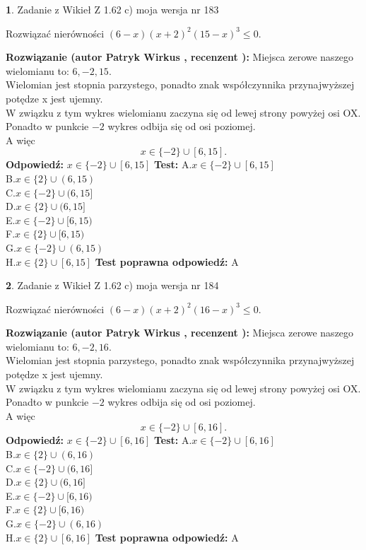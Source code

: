 \documentclass[12pt, a4paper]{article}
\theoremstyle{definition} %
\newtheorem{zad}{}
\newcommand{\zadStart}[1]{\begin{zad}#1\newline}
\newcommand{\zadStop}{\end{zad}}
\newcommand{\rozwStart}[2]{\noindent \textbf{Rozwiązanie (autor #1 , recenzent #2): }\newline}
\newcommand{\rozwStop}{\newline}
\newcommand{\odpStart}{\noindent \textbf{Odpowiedź:}\newline}
\newcommand{\odpStop}{\newline}
\newcommand{\testStart}{\noindent \textbf{Test:}\newline}
\newcommand{\testStop}{\newline}
\newcommand{\kluczStart}{\noindent \textbf{Test poprawna odpowiedź:}\newline}
\newcommand{\kluczStop}{\newline}
\begin{document}
\zadStart{Zadanie z Wikieł Z 1.62 c) moja wersja nr 183}

Rozwiązać nierówności $(6-x)(x+2)^{2}(15-x)^{3}\le0$.
\zadStop
\rozwStart{Patryk Wirkus}{}
Miejsca zerowe naszego wielomianu to: $6, -2, 15$.\\
Wielomian jest stopnia parzystego, ponadto znak współczynnika przy\linebreak najwyższej potędze x jest ujemny.\\ W związku z tym wykres wielomianu zaczyna się od lewej strony powyżej osi OX.\\
Ponadto w punkcie $-2$ wykres odbija się od osi poziomej.\\
A więc $$x \in \{-2\} \cup [6,15].$$
\rozwStop
\odpStart
$x \in \{-2\} \cup [6,15]$
\odpStop
\testStart
A.$x \in \{-2\} \cup [6,15]$\\
B.$x \in \{2\} \cup (6,15)$\\
C.$x \in \{-2\} \cup (6,15]$\\
D.$x \in \{2\} \cup (6,15]$\\
E.$x \in \{-2\} \cup [6,15)$\\
F.$x \in \{2\} \cup [6,15)$\\
G.$x \in \{-2\} \cup (6,15)$\\
H.$x \in \{2\} \cup [6,15]$
\testStop
\kluczStart
A
\kluczStop



\zadStart{Zadanie z Wikieł Z 1.62 c) moja wersja nr 184}

Rozwiązać nierówności $(6-x)(x+2)^{2}(16-x)^{3}\le0$.
\zadStop
\rozwStart{Patryk Wirkus}{}
Miejsca zerowe naszego wielomianu to: $6, -2, 16$.\\
Wielomian jest stopnia parzystego, ponadto znak współczynnika przy\linebreak najwyższej potędze x jest ujemny.\\ W związku z tym wykres wielomianu zaczyna się od lewej strony powyżej osi OX.\\
Ponadto w punkcie $-2$ wykres odbija się od osi poziomej.\\
A więc $$x \in \{-2\} \cup [6,16].$$
\rozwStop
\odpStart
$x \in \{-2\} \cup [6,16]$
\odpStop
\testStart
A.$x \in \{-2\} \cup [6,16]$\\
B.$x \in \{2\} \cup (6,16)$\\
C.$x \in \{-2\} \cup (6,16]$\\
D.$x \in \{2\} \cup (6,16]$\\
E.$x \in \{-2\} \cup [6,16)$\\
F.$x \in \{2\} \cup [6,16)$\\
G.$x \in \{-2\} \cup (6,16)$\\
H.$x \in \{2\} \cup [6,16]$
\testStop
\kluczStart
A
\kluczStop
\end{document}
